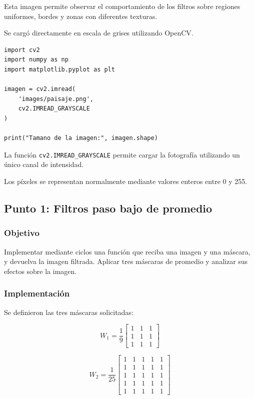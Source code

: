 \documentclass[11pt,letterpaper]{article}
\begin{document}
Esta imagen permite observar el comportamiento
de los filtros sobre regiones uniformes,
bordes y zonas con diferentes texturas.

Se cargó directamente en escala de grises
utilizando OpenCV.

\begin{lstlisting}
import cv2
import numpy as np
import matplotlib.pyplot as plt

imagen = cv2.imread(
    'images/paisaje.png',
    cv2.IMREAD_GRAYSCALE
)

print("Tamano de la imagen:", imagen.shape)
\end{lstlisting}

La función \texttt{cv2.IMREAD\_GRAYSCALE}
permite cargar la fotografía utilizando
un único canal de intensidad.

Los píxeles se representan normalmente
mediante valores enteros entre 0 y 255.

\subsection{Punto 1: Filtros paso bajo de promedio}

\subsubsection*{Objetivo}

Implementar mediante ciclos una función
que reciba una imagen y una máscara,
y devuelva la imagen filtrada.
Aplicar tres máscaras de promedio y analizar
sus efectos sobre la imagen.

\subsubsection*{Implementación}

Se definieron las tres máscaras solicitadas:

\[
W_1=\frac{1}{9}
\begin{bmatrix}
1&1&1\\
1&1&1\\
1&1&1
\end{bmatrix}
\]

\[
W_2=\frac{1}{25}
\begin{bmatrix}
1&1&1&1&1\\
1&1&1&1&1\\
1&1&1&1&1\\
1&1&1&1&1\\
1&1&1&1&1
\end{bmatrix}
\]
\end{document}
